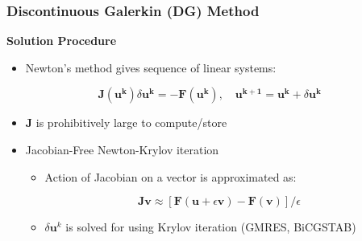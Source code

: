 \documentclass[9pt]{beamer}
\newcommand{\bv}[1]{\mathbf{#1}}
\begin{document}
\begin{frame}
\frametitle{Discontinuous Galerkin (DG) Method}
\label{sec-6-4}

\textbf{Solution Procedure}
\begin{itemize}
\item Newton's method gives sequence of linear systems:
\end{itemize}
$$\bv{J}(\bv{u^{k}}) \delta \bv{u^k} = -\bv{F}(\bv{u^{k}}),\quad \bv{u^{k+1}}=\bv{u^{k}}+\delta \bv{u^k}$$
\begin{itemize}
\item $\bv{J}$ is prohibitively large to compute/store
\item Jacobian-Free Newton-Krylov iteration
\begin{itemize}
\item Action of Jacobian on a vector is approximated as:
\end{itemize}
$$ \bv{J} \bv{v} \approx [\bv{F}(\bv{u} + \epsilon \bv{v}) - \bv{F}(\bv{v})]/\epsilon$$
\begin{itemize}
\item $\delta \bv{u}^k$ is solved for using Krylov iteration (GMRES, BiCGSTAB)
\end{itemize}
\end{itemize}
\end{frame}
\end{document}
